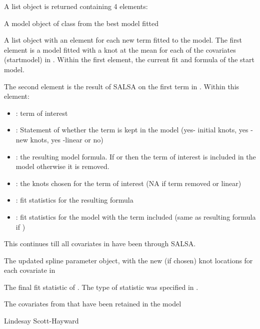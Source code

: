 \documentclass[a4paper]{book}
\begin{document}
\begin{Value}
A list object is returned containing 4 elements:

\begin{ldescription}
\item[\code{bestModel}] A model object of class  from the best model fitted
\item[\code{modelFits1D}] A list object with an element for each new term fitted to the model.  The first element is a model fitted with a knot at the mean for each of the covariates (startmodel) in .  Within the first element, the current fit and formula of the start model.  

The second element is the result of SALSA on the first term in .  Within this element:
\begin{itemize}

\item {}: term of interest
\item {}: Statement of whether the term is kept in the model (yes- initial knots, yes - new knots, yes -linear or no)
\item {}: the resulting model formula.  If  or  then the term of interest is included in the model otherwise it is removed.
\item {}: the knots chosen for the term of interest (NA if term removed or linear)
\item {}: fit statistics for the resulting formula
\item {}: fit statistics for the model with the term included (same as resulting formula if )

\end{itemize}
 

This continues till all covariates in  have been through SALSA.
\item[\code{splineParams}] The updated spline parameter object, with the new (if chosen) knot locations for each covariate in 
\item[\code{fitstat}] The final fit statistic of .  The type of statistic was specified in .
\item[\code{keptvarlist}] The covariates from  that have been retained in the model
\end{ldescription}
\end{Value}
%
\begin{Author}\relax
Lindesay Scott-Hayward
\end{Author}
\end{document}
